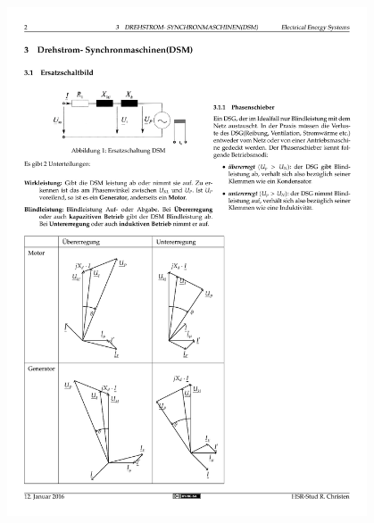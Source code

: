         \begin{minipage}[lt]{10cm}
        	\includegraphics[width=0.8\textwidth]{./images/Zeiger.pdf}
        \end{minipage}
